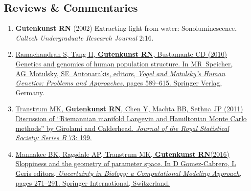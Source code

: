 \documentclass[11pt]{article}
\begin{document}
\subsection*{Reviews \& Commentaries}
\begin{enumerate}


\item \textbf{Gutenkunst RN} (2002) {Extracting light from water: Sonoluminescence}.
\newblock \emph{Caltech Undergraduate Research Journal} 2:16.


\item \href{http://doi.org/10.1007/978-3-540-37654-5}{Ramachandran S, Tang H, \textbf{Gutenkunst RN}, Bustamante CD (2010) {Genetics and
  genomics of human population structure}.
\newblock In MR~Speicher, AG~Motulsky, SE~Antonarakis, editors, \emph{Vogel and
  Motulsky's Human Genetics: Problems and Approaches}, pages 589--615. Springer
  Verlag, Germany.}

\item \href{http://doi.org/10.1111/j.1467-9868.2010.00765.x}{\grad Transtrum MK, \textbf{Gutenkunst RN}, Chen Y, Machta BB, Sethna JP
  (2011)
\newblock Discussion of ``{R}iemannian manifold {L}angevin and {H}amiltonian
  {M}onte {C}arlo methods'' by {G}irolami and {C}alderhead.
\newblock \emph{Journal of the Royal Statistical Society: Series B} 73:
  199.}

\item \href{http://doi.org/10.1007/978-3-319-21296-8_11}{Mannakee BK\trainee, Ragsdale AP\trainee, Transtrum MK, \textbf{Gutenkunst RN}\corresponding (2016) Sloppiness and the geometry of parameter space. In D Gomez-Cabrero, L Geris editors, \textit{Uncertainty in Biology: a Computational Modeling Approach}, pages 271--291. Springer International, Switzerland.}


\end{enumerate}
\end{document}
